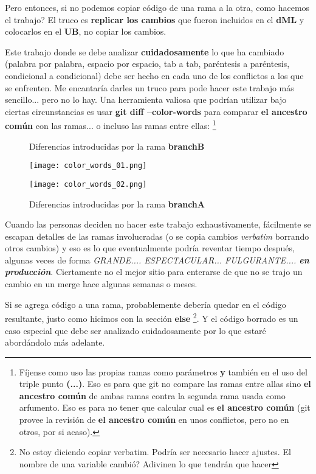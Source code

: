 Pero entonces, si no podemos copiar código de una rama a la otra, como hacemos el trabajo? El truco es {\bf replicar los cambios}
que fueron incluidos en el {\bf dML} y colocarlos en el {\bf UB}, no copiar los cambios.

Este trabajo donde se debe analizar {\bf cuidadosamente} lo que ha cambiado (palabra por palabra, espacio por espacio, tab a tab,
paréntesis a paréntesis, condicional a condicional) debe ser hecho en cada uno de los conflictos a los que se enfrenten. Me encantaría
darles un truco para pode hacer este trabajo más sencillo... pero no lo hay. Una herramienta valiosa que podrían utilizar
bajo ciertas circunstancias es usar {\bf git diff --color-words} para comparar {\bf el ancestro común} con las ramas... o incluso
las ramas entre ellas:
\footnote{Fíjense como uso las propias ramas como parámetros {\bf y} también en el uso del triple punto {\bf (...)}. Eso es para que
git no compare las ramas entre allas sino {\bf el ancestro común} de ambas ramas contra la segunda rama usada como arfumento. Eso es para
no tener que calcular cual es {\bf el ancestro común} (git provee la revisión de {\bf el ancestro común} en unos conflictos, pero
no en otros, por si acaso).}


\begin{figure}[h]
	\centering
	\caption{Diferencias introducidas por la rama {\bf branchB}}
	\texttt{[image: color\_words\_01.png]}
	\caption{Diferencias introducidas por la rama {\bf branchA}}
	\texttt{[image: color\_words\_02.png]}
\end{figure}

Cuando las personas deciden no hacer este trabajo exhaustivamente, fácilmente se escapan detalles de las ramas involucradas
(o se copia cambios {\it verbatim} borrando otros cambios) y eso es lo que eventualmente podría reventar tiempo después, algunas
veces de forma {\it GRANDE.... ESPECTACULAR... FULGURANTE.... {\bf en producción}}. Ciertamente no el mejor sitio para
enterarse de que no se trajo un cambio en un merge hace algunas semanas o meses.

Si se agrega código a una rama, probablemente debería quedar en el código resultante, justo como hicimos con la sección {\bf else}
\footnote{No estoy diciendo copiar verbatim. Podría ser necesario hacer ajustes. El nombre de una variable cambió? Adivinen
lo que tendrán que hacer}. Y el código borrado es un caso especial que debe ser analizado cuidadosamente por lo que estaré
abordándolo más adelante.

